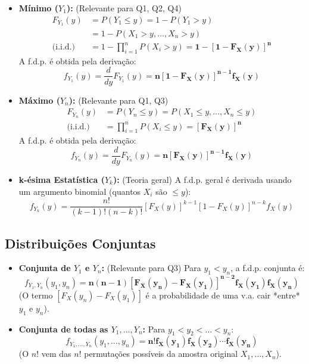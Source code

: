 \documentclass[12pt, a4paper]{article}
\begin{document}
\begin{itemize}
    \item \textbf{Mínimo ($Y_1$):} (Relevante para Q1, Q2, Q4)
        \begin{align*}
            F_{Y_1}(y) &= P(Y_1 \le y) = 1 - P(Y_1 > y) \\
                       &= 1 - P(X_1 > y, \dots, X_n > y) \\
            \text{(i.i.d.)} \quad &= 1 - \prod_{i=1}^n P(X_i > y) = \mathbf{1 - [1 - F_X(y)]^n}
        \end{align*}
        A f.d.p. é obtida pela derivação:
        $$ f_{Y_1}(y) = \frac{d}{dy} F_{Y_1}(y) = \mathbf{n [1 - F_X(y)]^{n-1} f_X(y)} $$

    \item \textbf{Máximo ($Y_n$):} (Relevante para Q1, Q3)
        \begin{align*}
            F_{Y_n}(y) &= P(Y_n \le y) = P(X_1 \le y, \dots, X_n \le y) \\
            \text{(i.i.d.)} \quad &= \prod_{i=1}^n P(X_i \le y) = \mathbf{[F_X(y)]^n}
        \end{align*}
        A f.d.p. é obtida pela derivação:
        $$ f_{Y_n}(y) = \frac{d}{dy} F_{Y_n}(y) = \mathbf{n [F_X(y)]^{n-1} f_X(y)} $$
    
    \item \textbf{k-ésima Estatística ($Y_k$):} (Teoria geral)
        A f.d.p. geral é derivada usando um argumento binomial (quantos $X_i$ são $\le y$):
        $$ f_{Y_k}(y) = \frac{n!}{(k-1)!(n-k)!} [F_X(y)]^{k-1} [1 - F_X(y)]^{n-k} f_X(y) $$
\end{itemize}

\subsection{Distribuições Conjuntas}

\begin{itemize}
    \item \textbf{Conjunta de $Y_1$ e $Y_n$:} (Relevante para Q3)
        Para $y_1 < y_n$, a f.d.p. conjunta é:
        $$ f_{Y_1, Y_n}(y_1, y_n) = \mathbf{n(n-1) [F_X(y_n) - F_X(y_1)]^{n-2} f_X(y_1) f_X(y_n)} $$
        (O termo $[F_X(y_n) - F_X(y_1)]$ é a probabilidade de uma v.a. cair *entre* $y_1$ e $y_n$).

    \item \textbf{Conjunta de todas as $Y_1, \dots, Y_n$:}
        Para $y_1 < y_2 < \dots < y_n$:
        $$ f_{Y_1, \dots, Y_n}(y_1, \dots, y_n) = \mathbf{n! f_X(y_1) f_X(y_2) \cdots f_X(y_n)} $$
        (O $n!$ vem das $n!$ permutações possíveis da amostra original $X_1, \dots, X_n$).
\end{itemize}
\end{document}
